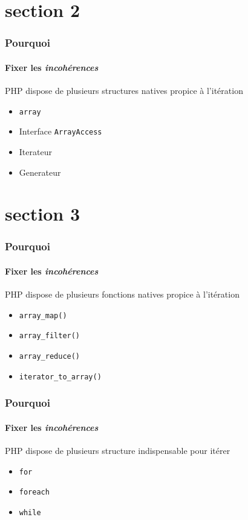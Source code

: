 \section{section 2}
\begin{frame}
	\frametitle{Pourquoi}
    \framesubtitle{Fixer les \textit{incohérences}}

    PHP dispose de plusieurs structures natives propice à l'itération

    \begin{itemize}[<+->]
        \item \texttt{array}
        \item Interface \texttt{ArrayAccess}
        \item Iterateur
        \item Generateur
    \end{itemize}
\end{frame}

\section{section 3}
\begin{frame}
	\frametitle{Pourquoi}
    \framesubtitle{Fixer les \textit{incohérences}}

    PHP dispose de plusieurs fonctions natives propice à l'itération

    \begin{itemize}[<+->]
        \item \texttt{array\_map()}
        \item \texttt{array\_filter()}
        \item \texttt{array\_reduce()}
        \item \texttt{iterator\_to\_array()}
    \end{itemize}
\end{frame}

\begin{frame}
	\frametitle{Pourquoi}
    \framesubtitle{Fixer les \textit{incohérences}}

    PHP dispose de plusieurs structure indispensable pour itérer

    \begin{itemize}[<+->]
        \item \texttt{for}
        \item \texttt{foreach}
        \item \texttt{while}
    \end{itemize}
\end{frame}

